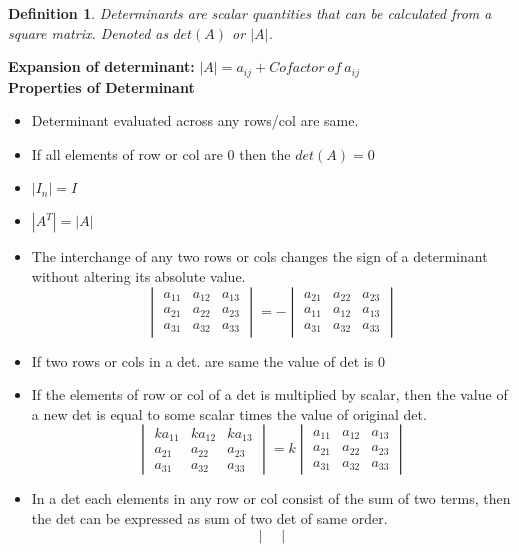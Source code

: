 \documentclass[12pt]{article}
\newtheorem*{defn}{Definition}
\begin{document}
\begin{defn}\normalfont
	Determinants are scalar quantities that can be calculated from a square matrix. Denoted as $det(A)$ or $|A|$.
\end{defn}
\textbf{Expansion of determinant:} $|A| = a_{ij} + Cofactor \:of \:a_{ij}$\\
\textbf{Properties of Determinant}
\begin{itemize}
	\item Determinant evaluated across any rows/col are same.
	\item If all elements of row or col are $0$ then the $det(A)=0$
	\item $|I_n|=I$
	\item $|A^T|=|A|$
	\item The interchange of any two rows or cols changes the sign of a determinant without altering its absolute value.
	\[
	  \begin{vmatrix}
	  	a_{11} & a_{12} & a_{13} \\
	  	a_{21} & a_{22} & a_{23} \\
	  	a_{31} & a_{32} & a_{33} 
	  \end{vmatrix}
	  = -
	  \begin{vmatrix}
	  a_{21} & a_{22} & a_{23} \\
	  a_{11} & a_{12} & a_{13} \\
	  a_{31} & a_{32} & a_{33} 
	  \end{vmatrix}	  
	\]
	\item If two rows or cols in a det. are same the value of det is $0$
	\item If the elements of row or col of a det is multiplied by scalar, then the value of a new det is equal to some scalar times the value of original det.
	\[
		\begin{vmatrix}
		ka_{11} & ka_{12} & ka_{13} \\
		a_{21} & a_{22} & a_{23} \\
		a_{31} & a_{32} & a_{33} 
		\end{vmatrix}
		=k
			\begin{vmatrix}
		a_{11} & a_{12} & a_{13} \\
		a_{21} & a_{22} & a_{23} \\
		a_{31} & a_{32} & a_{33} 
		\end{vmatrix}
	\]
	\item In a det each elements in any row or col consist of the sum of two terms, then the det can be expressed as sum of two det of same order.
	\[
		\begin{vmatrix}

\end{vmatrix}\]
\end{itemize}
\end{document}
